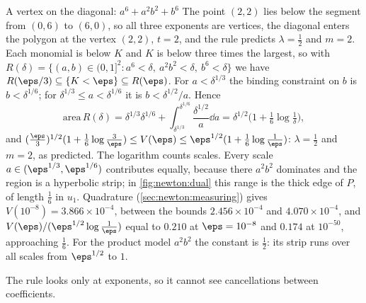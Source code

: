 \begin{refsection}
\begin{computation}{A vertex on the diagonal: $a^6+a^2b^2+b^6$}\label{comp:newton:vertex}
\step The point $(2,2)$ lies below the segment from $(0,6)$ to $(6,0)$, so all three exponents are vertices, the diagonal enters the polygon at the vertex $(2,2)$, $t=2$, and the rule predicts $\lambda=\frac12$ and $m=2$.
\step Each monomial is below $K$ and $K$ is below three times the largest, so with $R(\delta)=\{(a,b)\in(0,1]^2:a^6<\delta,\ a^2b^2<\delta,\ b^6<\delta\}$ we have $R(\eps/3)\subseteq\{K<\eps\}\subseteq R(\eps)$.
\step For $a<\delta^{1/3}$ the binding constraint on $b$ is $b<\delta^{1/6}$; for $\delta^{1/3}\le a<\delta^{1/6}$ it is $b<\delta^{1/2}/a$. Hence
\[
\mathrm{area}\,R(\delta)=\delta^{1/3}\delta^{1/6}+\int_{\delta^{1/3}}^{\delta^{1/6}}\frac{\delta^{1/2}}a\dd a=\delta^{1/2}\bigl(1+\tfrac16\log\tfrac1\delta\bigr),
\]
and $(\frac\eps3)^{1/2}(1+\frac16\log\frac3\eps)\le V(\eps)\le\eps^{1/2}(1+\frac16\log\frac1\eps)$: $\lambda=\frac12$ and $m=2$, as predicted.
\step The logarithm counts scales. Every scale $a\in(\eps^{1/3},\eps^{1/6})$ contributes equally, because there $a^2b^2$ dominates and the region is a hyperbolic strip; in \cref{fig:newton:dual} this range is the thick edge of $P$, of length $\frac16$ in $u_1$. Quadrature (\cref{sec:newton:measuring}) gives $V(10^{-8})=3.866\times10^{-4}$, between the bounds $2.456\times10^{-4}$ and $4.070\times10^{-4}$, and $V(\eps)/(\eps^{1/2}\log\frac1\eps)$ equal to $0.210$ at $\eps=10^{-8}$ and $0.174$ at $10^{-50}$, approaching $\frac16$. For the product model $a^2b^2$ the constant is $\frac12$: its strip runs over all scales from $\eps^{1/2}$ to $1$.
\end{computation}

The rule looks only at exponents, so it cannot see cancellations between coefficients.


\end{refsection}
